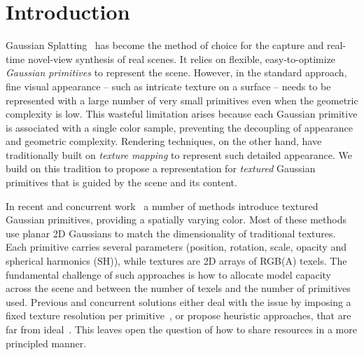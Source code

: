 \section{Introduction}
%
%

Gaussian Splatting~\cite{3dgs,2dgs} has become the method of choice for the  capture and real-time novel-view synthesis of real scenes. It relies on flexible, easy-to-optimize \emph{Gaussian primitives} to represent the scene.
However, in the standard approach, fine visual appearance -- such as intricate texture on a surface -- needs to be represented with a large number of very small primitives even when the geometric complexity is low. 
This wasteful limitation arises because each Gaussian primitive is associated with a single color sample, preventing the decoupling of appearance and geometric complexity.
Rendering techniques, on the other hand, have traditionally built on \emph{texture mapping} to represent such detailed appearance. We build on this tradition to propose a representation for {\em textured} Gaussian primitives that is guided by the scene and its content.

In recent and concurrent work~\cite{bbsplat, gstex, textured3dgs, supergaussians} a number of methods introduce textured Gaussian primitives, 
providing a spatially varying color.
Most of these methods
use planar 2D Gaussians to match the dimensionality of traditional textures.
Each primitive carries several parameters (position, rotation, scale, opacity and spherical harmonics (SH)),
while textures are 2D arrays of RGB(A) texels.
The fundamental challenge of such approaches is how to allocate model capacity across the scene
and between the number of texels and the number of primitives used.
Previous and concurrent solutions either deal with the issue by imposing a fixed texture resolution per primitive~\cite{bbsplat, supergaussians, textured3dgs}, or propose heuristic approaches, that are far from ideal~\cite{gstex}.
This leaves open the question of how to share resources in a more principled manner.%

